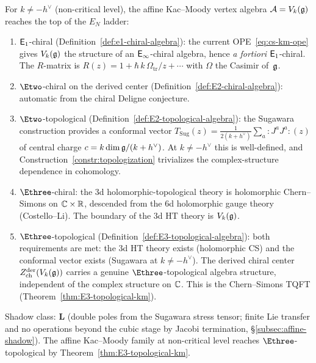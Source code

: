 \begin{remark}
\label{rem:km-EN-level}
For $k \ne -h^\vee$ (non-critical level), the affine
Kac--Moody vertex algebra $\mathcal{A} = V_k(\mathfrak{g})$ reaches the
top of the $E_N$ ladder:
\begin{enumerate}[label=\textup{(\roman*)}]
\item $\mathsf{E}_1$-chiral
 (Definition~\ref{def:e1-chiral-algebra}): the current
 OPE~\eqref{eq:cs-km-ope} gives $V_k(\mathfrak{g})$ the
 structure of an $\mathsf{E}_{\infty}$-chiral algebra, hence
 \emph{a fortiori} $\mathsf{E}_1$-chiral.
 The $R$-matrix is $R(z) = 1 + \hbar\,k\,\Omega_{\mathrm{tr}}/z + \cdots$
 with $\Omega$ the Casimir of~$\mathfrak{g}$.

\item $\Etwo$-chiral on the derived center
 (Definition~\ref{def:E2-chiral-algebra}): automatic from
 the chiral Deligne conjecture.

\item $\Etwo$-topological
 (Definition~\ref{def:E2-topological-algebra}): the
 Sugawara construction provides a conformal vector
 $T_{\mathrm{Sug}}(z)
 = \frac{1}{2(k + h^\vee)}
 \sum_a {:}\!J^a J^a\!{:}(z)$
 of central charge $c = k\dim\mathfrak{g}/(k + h^\vee)$.
 At $k \ne -h^\vee$ this is well-defined, and
 Construction~\ref{constr:topologization} trivializes the
 complex-structure dependence in cohomology.

\item $\Ethree$-chiral: the 3d holomorphic-topological
 theory is holomorphic Chern--Simons on $\mathbb{C} \times \mathbb{R}$,
 descended from the 6d holomorphic gauge theory
 (Costello--Li). The boundary of the 3d HT theory is
 $V_k(\mathfrak{g})$.

\item $\Ethree$-topological
 (Definition~\ref{def:E3-topological-algebra}): both
 requirements are met: the 3d HT theory exists
 (holomorphic CS) and the conformal vector exists
 (Sugawara at $k \ne -h^\vee$). The derived chiral
 center $Z^{\mathrm{der}}_{\mathrm{ch}}(V_k(\mathfrak{g}))$
 carries a genuine $\Ethree$-topological algebra
 structure, independent of the complex structure on
 $\mathbb{C}$. This is the Chern--Simons TQFT
 \textup{(}Theorem~\ref{thm:E3-topological-km}\textup{)}.
\end{enumerate}
Shadow class: $\mathbf{L}$ (double poles from the
Sugawara stress tensor; finite Lie transfer and no operations beyond
the cubic stage by Jacobi termination, \S\ref{subsec:affine-shadow}).
The affine Kac--Moody family at non-critical level reaches
$\Ethree$-topological by
Theorem~\ref{thm:E3-topological-km}.
\end{remark}

